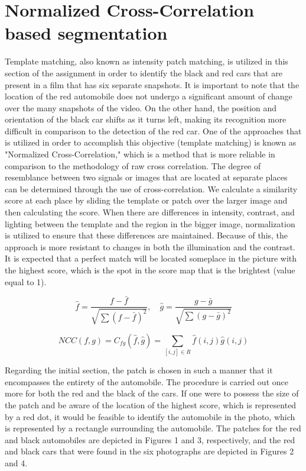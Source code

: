 \section{Normalized Cross-Correlation based segmentation}\label{P1}

Template matching, also known as intensity patch matching, is utilized in this section of the assignment in order to identify the black and red cars that are present in a film that has six separate snapshots. It is important to note that the location of the red automobile does not undergo a significant amount of change over the many snapshots of the video. On the other hand, the position and orientation of the black car shifts as it turns left, making its recognition more difficult in comparison to the detection of the red car. One of the approaches that is utilized in order to accomplish this objective (template matching) is known as "Normalized Cross-Correlation," which is a method that is more reliable in comparison to the methodology of raw cross correlation. The degree of resemblance between two signals or images that are located at separate places can be determined through the use of cross-correlation. We calculate a similarity score at each place by sliding the template or patch over the larger image and then calculating the score. When there are differences in intensity, contrast, and lighting between the template and the region in the bigger image, normalization is utilized to ensure that these differences are maintained. Because of this, the approach is more resistant to changes in both the illumination and the contrast. It is expected that a perfect match will be located someplace in the picture with the highest score, which is the spot in the score map that is the brightest (value equal to 1).


\[
\hat{f} = \frac{f - \bar{f}}{\sqrt{\sum (f - \bar{f})^2}}, \quad
\hat{g} = \frac{g - \bar{g}}{\sqrt{\sum (g - \bar{g})^2}}
\]

\[
NCC(f, g) = C_{fg}(\hat{f}, \hat{g}) = \sum_{[i,j] \in R} \hat{f}(i, j)\hat{g}(i, j)
\]

Regarding the initial section, the patch is chosen in such a manner that it encompasses the entirety of the automobile. The procedure is carried out once more for both the red and the black of the cars. If one were to possess the size of the patch and be aware of the location of the highest score, which is represented by a red dot, it would be feasible to identify the automobile in the photo, which is represented by a rectangle surrounding the automobile. The patches for the red and black automobiles are depicted in Figures 1 and 3, respectively, and the red and black cars that were found in the six photographs are depicted in Figures 2 and 4.


